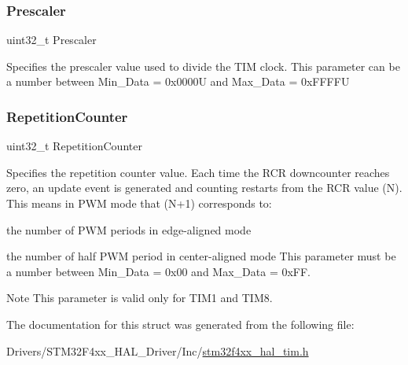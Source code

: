 \subsubsection{\texorpdfstring{Prescaler}{Prescaler}}
{\footnotesize\ttfamily uint32\+\_\+t Prescaler}

Specifies the prescaler value used to divide the T\+IM clock. This parameter can be a number between Min\+\_\+\+Data = 0x0000U and Max\+\_\+\+Data = 0x\+F\+F\+F\+FU \mbox{\label{struct_t_i_m___base___init_type_def_a3c2ea8434bbce30aa191a816e27f9c1f}} 
\subsubsection{\texorpdfstring{Repetition\+Counter}{RepetitionCounter}}
{\footnotesize\ttfamily uint32\+\_\+t Repetition\+Counter}

Specifies the repetition counter value. Each time the R\+CR downcounter reaches zero, an update event is generated and counting restarts from the R\+CR value (N). This means in P\+WM mode that (N+1) corresponds to\+:
\begin{DoxyItemize}
\item the number of P\+WM periods in edge-\/aligned mode
\item the number of half P\+WM period in center-\/aligned mode This parameter must be a number between Min\+\_\+\+Data = 0x00 and Max\+\_\+\+Data = 0x\+FF. \begin{DoxyNote}{Note}
This parameter is valid only for T\+I\+M1 and T\+I\+M8. 
\end{DoxyNote}

\end{DoxyItemize}

The documentation for this struct was generated from the following file\+:\begin{DoxyCompactItemize}
\item 
Drivers/\+S\+T\+M32\+F4xx\+\_\+\+H\+A\+L\+\_\+\+Driver/\+Inc/\mbox{\hyperlink{stm32f4xx__hal__tim_8h}{stm32f4xx\+\_\+hal\+\_\+tim.\+h}}\end{DoxyCompactItemize}
